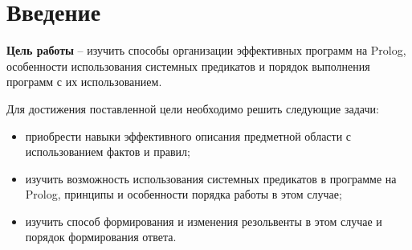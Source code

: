 {\large\section*{Введение}}

\textbf{Цель работы} -- изучить способы организации эффективных программ на Prolog, особенности использования системных предикатов и порядок выполнения программ с их использованием.

Для достижения поставленной цели необходимо решить следующие задачи:

\begin{itemize}[$\bullet$]
	\item приобрести навыки эффективного описания предметной области с использованием фактов и правил;
	\item изучить возможность использования системных предикатов в программе на Prolog, принципы и особенности порядка работы в этом случае; 
	\item изучить способ формирования и изменения резольвенты в этом случае и порядок формирования ответа.
\end{itemize}

